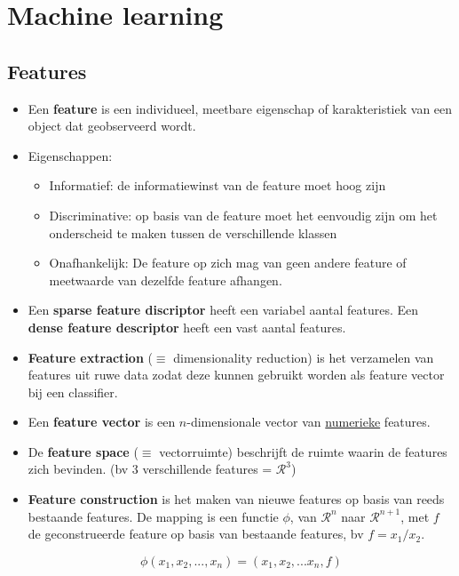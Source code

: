 \section{Machine learning}
\subsection{Features}
\begin{itemize}
	\item Een \textbf{feature} is een individueel, meetbare eigenschap of karakteristiek van een object dat geobserveerd wordt.
	\item Eigenschappen:
	\begin{itemize}
		\item Informatief: de informatiewinst van de feature moet hoog zijn
		\item Discriminative: op basis van de feature moet het eenvoudig zijn om het onderscheid te maken tussen de verschillende klassen
		\item Onafhankelijk: De feature op zich mag van geen andere feature of meetwaarde van dezelfde feature afhangen.


	\end{itemize}
	\item Een \textbf{sparse feature discriptor} heeft een variabel aantal features. Een \textbf{dense feature descriptor} heeft een vast aantal features.
	\item \textbf{Feature extraction} ($\equiv$ dimensionality reduction) is het verzamelen van features uit ruwe data zodat deze kunnen gebruikt worden als feature vector bij een classifier. 
	\item Een \textbf{feature vector} is een $n$-dimensionale vector van \underline{numerieke} features.
	\item De \textbf{feature space} ($\equiv$ vectorruimte) beschrijft de ruimte waarin de features zich bevinden. (bv 3 verschillende features = $\mathcal{R}^3$)
	\item \textbf{Feature construction} is het maken van nieuwe features op basis van reeds bestaande features. De mapping is een functie $\phi$, van $\mathcal{R}^n$ naar $\mathcal{R}^{n + 1}$, met $f$ de geconstrueerde feature op basis van bestaande features, bv $f = x_1/x_2$.
	
	$$\phi(x_1, x_2, ..., x_n) = (x_1, x_2, ... x_n, f)$$

\end{itemize}
